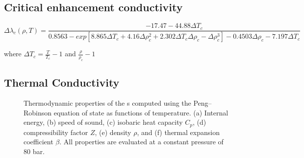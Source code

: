 \subsection{Critical enhancement conductivity}

\begin{equation}
    \Delta\lambda_c(\rho,T) = \frac{-17.47-44.88\Delta T_c}{0.8563-exp[8.865\Delta T_c +4.16\Delta \rho_c^2 + 2.302\Delta T_c \Delta\rho_c - \Delta\rho_c^3] -0.4503\Delta\rho_c - 7.197\Delta T_c}    
\end{equation}

where $\Delta T_c= \frac{T}{T_c}-1$ and $\frac{\rho}{\rho_c}-1$


\subsection{Thermal Conductivity}

\begin{figure*}[htbp]
    \centering
    \subfloat[]{%
        \label{fig:subfig1}%
    }\hfill
    \subfloat[]{%
        \label{fig:subfig2}%
    }\hfill
    \subfloat[]{%
        \label{fig:subfig3}%
    }\hfill
    \subfloat[]{%
        \label{fig:subfig4}%
    }\hfill
    \subfloat[]{%
        \label{fig:subfig5}%
    }\hfill
    \subfloat[]{%
        \label{fig:subfig6}%
    }
    \caption{
Thermodynamic properties of the s computed using the Peng–Robinson equation of state as functions of temperature. 
(a) Internal energy, 
(b) speed of sound, 
(c) isobaric heat capacity \(C_p\), 
(d) compressibility factor \(Z\), 
(e) density \(\rho\), and 
(f) thermal expansion coefficient \(\beta\). 
All properties are evaluated at a constant pressure of 80 bar.
    }
    \label{fig:multi1}
\end{figure*}